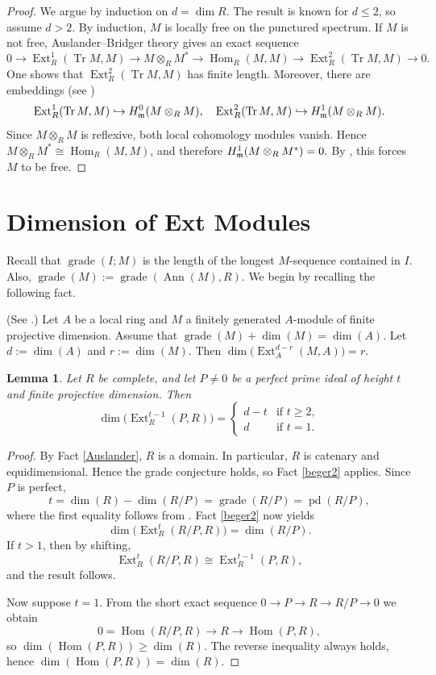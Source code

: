 \documentclass[11.05pt,a4paper]{amsart}
\newtheorem{lemma}[theorem]{Lemma}
\theoremstyle{definition}
\theoremstyle{remark}
\newcommand{\grade}{\operatorname{grade}}
\newcommand{\Tr}{\operatorname{Tr}}
\newcommand{\pd}{\operatorname{pd}}
\newcommand{\Ext}{\operatorname{Ext}}
\newcommand{\Hom}{\operatorname{Hom}}
\newcommand{\Ann}{\operatorname{Ann}}
\newcommand{\lo}{\longrightarrow}
\newcommand{\fm}{\frak{m}}
\begin{document}
\begin{proof}
	We argue by induction on \( d = \dim R \). The result is known for \( d \le 2 \), so assume \( d>2 \). By induction, \( M \) is locally free on the punctured spectrum. If \( M \) is not free, Auslander–Bridger theory gives an exact sequence
	\[
	0 \to \Ext^1_R(\Tr M,M) \to M \otimes_R M^* \to \Hom_R(M,M) \to \Ext^2_R(\Tr M,M) \to 0.
	\]
	One shows that \( \Ext^2_R(\Tr M,M) \) has finite length. Moreover, there are embeddings (see \cite{ACS})
	\[
	\Ext^1_R(\Tr M,M) \hookrightarrow H^0_{\fm}(M \otimes_R M), \quad
	\Ext^2_R(\Tr M,M) \hookrightarrow H^1_{\fm}(M \otimes_R M).
	\]
	Since \( M \otimes_R M \) is reflexive, both local cohomology modules vanish. Hence \( M \otimes_R M^* \cong \Hom_R(M,M) \), and therefore
	\(
	H^1_{\fm}(M \otimes_R M^*) = 0.
	\)
	By \cite[Lemma 8.1]{ACS}, this forces \( M \) to be free.
\end{proof}\medskip
\section{Dimension of Ext Modules}

Recall that $\grade(I;M)$ is the length of the longest $M$-sequence contained in $I$. Also,
\(
\grade(M):= \grade(\Ann(M),R).
\)
We begin by recalling the following fact.

\begin{fact}\label{beger2}
	(See \cite[3.7]{Beder}.)  
	Let $A$ be a local ring and $M$ a finitely generated $A$-module of finite projective dimension. Assume that
	\(
	\grade(M) + \dim(M) = \dim(A).
	\)
	Let $d := \dim(A)$ and $r := \dim(M)$. Then
	\(
	\dim\big(\Ext^{d-r}_A(M,A)\big) = r.
	\)
\end{fact}

\begin{lemma}\label{45}
	Let $R$ be complete, and let $P \neq 0$ be a perfect prime ideal of height $t$ and finite projective dimension. Then
	\[
	\dim\!\big(\Ext^{t-1}_R(P,R)\big) =
	\begin{cases}
	d - t & \text{if } t \ge 2, \\
	d & \text{if } t = 1.
	\end{cases}
	\]
\end{lemma}

\begin{proof}
	By Fact \ref{Auslander}, $R$ is a domain. In particular, $R$ is catenary and equidimensional. Hence the grade conjecture holds, so Fact \ref{beger2} applies.
	Since $P$ is perfect,
	\[
	t = \dim(R) - \dim(R/P) = \grade(R/P) = \pd(R/P),
	\]
	where the first equality follows from \cite[Lemma 2, p.\ 250]{mat}. Fact \ref{beger2} now yields
	\[
	\dim\!\big(\Ext^{t}_R(R/P,R)\big) = \dim(R/P).
	\]
	If $t > 1$, then by shifting,
	\[
	\Ext^{t}_R(R/P,R) \cong \Ext^{t-1}_R(P,R),
	\]
	and the result follows.
	
	Now suppose $t=1$. From the short exact sequence
	\(
	0 \to P \to R \to R/P \to 0
	\)
	we obtain
	\[
	0 = \Hom(R/P,R) \lo R \lo \Hom(P,R),
	\]
	so $\dim(\Hom(P,R)) \ge \dim(R)$. The reverse inequality always holds, hence
	\(
	\dim(\Hom(P,R)) = \dim(R).
	\)
\end{proof}
\end{document}

